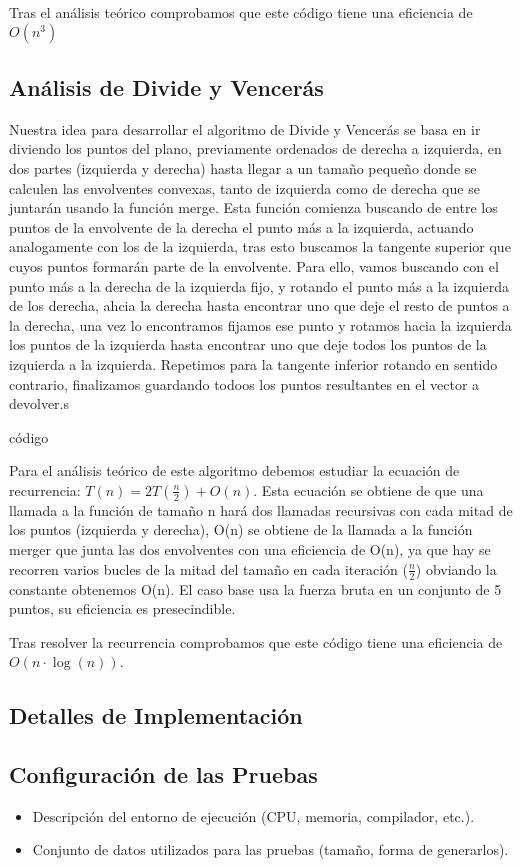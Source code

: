 \documentclass[a4paper,12pt]{article}
\begin{document}
Tras el análisis teórico comprobamos que este código tiene una eficiencia de $O(n^3)$

\subsection{Análisis de Divide y Vencerás}
Nuestra idea para desarrollar el algoritmo de Divide y Vencerás se basa en ir diviendo los puntos del plano, previamente ordenados 
de derecha a izquierda, en dos partes (izquierda y derecha) hasta llegar a un tamaño pequeño donde se calculen las envolventes convexas,
tanto de izquierda como de derecha que se juntarán usando la función merge. Esta función comienza buscando de entre los puntos de la envolvente de la derecha 
el punto más a la izquierda, actuando analogamente con los de la izquierda, tras esto buscamos la tangente superior que cuyos puntos 
formarán parte de la envolvente. Para ello, vamos buscando con el punto más a la derecha de la izquierda fijo, y rotando el punto más a la 
izquierda de los derecha, ahcia la derecha hasta encontrar uno que deje el resto de puntos a la derecha, una vez lo encontramos fijamos 
ese punto y rotamos hacia la izquierda los puntos de la izquierda hasta encontrar uno que deje todos los puntos de la izquierda a la izquierda.
Repetimos para la tangente inferior rotando en sentido contrario, finalizamos guardando todoos los puntos resultantes en el vector a devolver.s

código

Para el análisis teórico de este algoritmo debemos estudiar la ecuación de recurrencia: $T(n) = 2T(\frac{n}{2}) + O(n)$.
Esta ecuación se obtiene de que una llamada a la función de tamaño n hará dos llamadas recursivas con cada mitad de los puntos (izquierda y derecha),
O(n) se obtiene de la llamada a la función merger que junta las dos envolventes con una eficiencia de O(n), ya que
hay se recorren varios bucles de la mitad del tamaño en cada iteración ($\frac{n}{2}$) obviando la constante obtenemos O(n).
El caso base usa la fuerza bruta en un conjunto de 5 puntos, su eficiencia es presecindible.

Tras resolver la recurrencia comprobamos que este código tiene una eficiencia de $O(n\cdot \log (n))$.

\subsection{Detalles de Implementación}

\subsection{Configuración de las Pruebas}
\begin{itemize}
	\item Descripción del entorno de ejecución (CPU, memoria, compilador, etc.).
	\item Conjunto de datos utilizados para las pruebas (tamaño, forma de generarlos).
\end{itemize}
\end{document}

